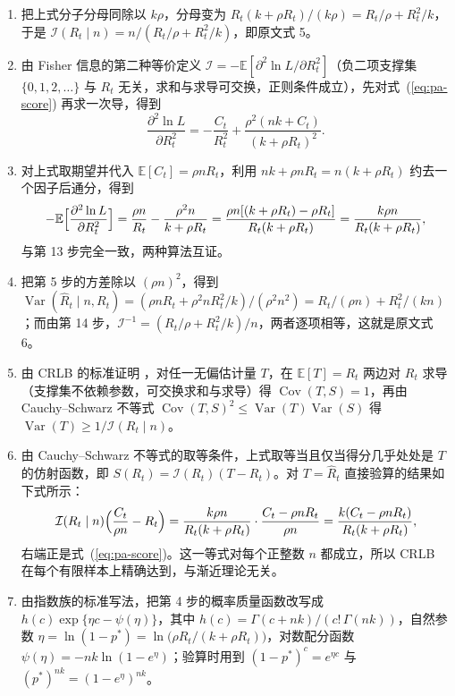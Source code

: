 \begin{enumerate}
\begin{equation*}
\end{equation*}
\item 把上式分子分母同除以 $k\rho$，分母变为 $R_t(k+\rho R_t)/(k\rho)=R_t/\rho+R_t^2/k$，于是 $\mathcal{I}(R_t\mid n)=n/(R_t/\rho+R_t^2/k)$，即原文式 5。
\item 由 Fisher 信息的第二种等价定义 $\mathcal{I}=-\mathbb{E}[\partial^2\ln L/\partial R_t^2]$（负二项支撑集 $\{0,1,2,\dots\}$ 与 $R_t$ 无关，求和与求导可交换，正则条件成立），先对式~(\ref{eq:pa-score}) 再求一次导，得到
\begin{equation*}
\frac{\partial^2\ln L}{\partial R_t^2}=-\frac{C_t}{R_t^2}+\frac{\rho^2(nk+C_t)}{(k+\rho R_t)^2}.
\end{equation*}
\item 对上式取期望并代入 $\mathbb{E}[C_t]=\rho nR_t$，利用 $nk+\rho nR_t=n(k+\rho R_t)$ 约去一个因子后通分，得到
\begin{equation*}
-\mathbb{E}\Bigl[\frac{\partial^2\ln L}{\partial R_t^2}\Bigr]=\frac{\rho n}{R_t}-\frac{\rho^2n}{k+\rho R_t}=\frac{\rho n[(k+\rho R_t)-\rho R_t]}{R_t(k+\rho R_t)}=\frac{k\rho n}{R_t(k+\rho R_t)},
\end{equation*}
与第 13 步完全一致，两种算法互证。
\item 把第 5 步的方差除以 $(\rho n)^2$，得到 $\operatorname{Var}(\widehat{R}_t\mid n,R_t)=(\rho nR_t+\rho^2nR_t^2/k)/(\rho^2n^2)=R_t/(\rho n)+R_t^2/(kn)$；而由第 14 步，$\mathcal{I}^{-1}=(R_t/\rho+R_t^2/k)/n$，两者逐项相等，这就是原文式 6。
\item 由 CRLB 的标准证明 \citep{casella2002statistical,lehmann1998point}，对任一无偏估计量 $T$，在 $\mathbb{E}[T]=R_t$ 两边对 $R_t$ 求导（支撑集不依赖参数，可交换求和与求导）得 $\operatorname{Cov}(T,S)=1$，再由 Cauchy--Schwarz 不等式 $\operatorname{Cov}(T,S)^2\le\operatorname{Var}(T)\operatorname{Var}(S)$ 得 $\operatorname{Var}(T)\ge1/\mathcal{I}(R_t\mid n)$。
\item 由 Cauchy--Schwarz 不等式的取等条件，上式取等当且仅当得分几乎处处是 $T$ 的仿射函数，即 $S(R_t)=\mathcal{I}(R_t)(T-R_t)$。对 $T=\widehat{R}_t$ 直接验算的结果如下式所示：
\begin{equation*}
\mathcal{I}(R_t\mid n)\Bigl(\frac{C_t}{\rho n}-R_t\Bigr)=\frac{k\rho n}{R_t(k+\rho R_t)}\cdot\frac{C_t-\rho nR_t}{\rho n}=\frac{k(C_t-\rho nR_t)}{R_t(k+\rho R_t)},
\end{equation*}
右端正是式~(\ref{eq:pa-score})。这一等式对每个正整数 $n$ 都成立，所以 CRLB 在每个有限样本上精确达到，与渐近理论无关。
\item 由指数族的标准写法，把第 4 步的概率质量函数改写成 $h(c)\exp\{\eta c-\psi(\eta)\}$，其中 $h(c)=\Gamma(c+nk)/(c!\,\Gamma(nk))$，自然参数 $\eta=\ln(1-p^*)=\ln\bigl(\rho R_t/(k+\rho R_t)\bigr)$，对数配分函数 $\psi(\eta)=-nk\ln(1-e^{\eta})$；验算时用到 $(1-p^*)^c=e^{\eta c}$ 与 $(p^*)^{nk}=(1-e^{\eta})^{nk}$。

\end{enumerate}
